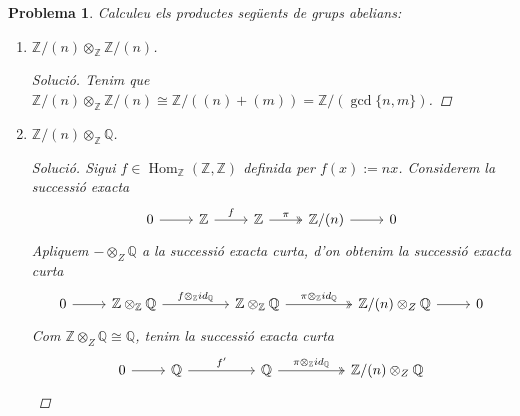 \documentclass[compress]{article}
\newtheorem{problema}{Problema}
\theoremstyle{definition}
\DeclareMathOperator{\Hom}{Hom}
\begin{document}
\begin{problema}
    Calculeu els productes següents de grups abelians:
    \begin{enumerate}
        \item $\mathbb{Z}/(n)\otimes_{\mathbb{Z}}\mathbb{Z}/(n)$.
        \begin{proof}[Solució]
            Tenim que $\mathbb{Z}/(n)\otimes_{\mathbb{Z}}\mathbb{Z}/(n)\cong\mathbb{Z}/((n)+(m))=\mathbb{Z}/(\gcd\{n,m\})$.
        \end{proof}
        \item $\mathbb{Z}/(n)\otimes_{\mathbb{Z}}\mathbb{Q}$.
        \begin{proof}[Solució]
            Sigui $f\in\Hom_{\mathbb{Z}}(\mathbb{Z},\mathbb{Z})$ definida per $f(x):=nx$. Considerem la successió exacta
            \begin{equation*}
            \begin{tikzcd}
                0
                \arrow{r}
                &\mathbb{Z}
                \arrow{r}{f}
                &\mathbb{Z}
                \arrow[two heads]{r}{\pi}
                &\mathbb{Z}/(n)
                \arrow{r}
                &0
            \end{tikzcd}
            \end{equation*}
            Apliquem $-\otimes_{Z}\mathbb{Q}$ a la successió exacta curta, d'on obtenim la successió exacta curta
            \begin{equation*}
            \begin{tikzcd}
                0
                \arrow{r}
                &\mathbb{Z}\otimes_{\mathbb{Z}}\mathbb{Q}
                \arrow{rr}{f\otimes_{\mathbb{Z}}id_{\mathbb{Q}}}
                &&\mathbb{Z}\otimes_{\mathbb{Z}}\mathbb{Q}
                \arrow[two heads]{rr}{\pi\otimes_{\mathbb{Z}}id_{\mathbb{Q}}}
                &&\mathbb{Z}/(n)\otimes_{Z}\mathbb{Q}
                \arrow{r}
                &0
            \end{tikzcd}
            \end{equation*}
            Com $\mathbb{Z}\otimes_{Z}\mathbb{Q}\cong\mathbb{Q}$, tenim la successió exacta curta
            \begin{equation*}
            \begin{tikzcd}
                0
                \arrow{r}
                &\mathbb{Q}
                \arrow{rr}{f'}
                &&\mathbb{Q}
                \arrow[two heads]{rr}{\pi\otimes_{\mathbb{Z}}id_{\mathbb{Q}}}
                &&\mathbb{Z}/(n)\otimes_{Z}\mathbb{Q}

\end{tikzcd}
\end{equation*}
\end{proof}
\end{enumerate}
\end{problema}
\end{document}
